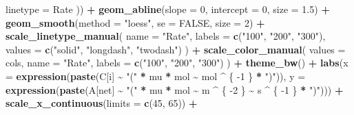 \documentclass[
]{krantz}
\makeatletter
\newenvironment{Shaded}{\begin{snugshade}}{\end{snugshade}}
\newcommand{\DataTypeTok}[1]{\textcolor[rgb]{0.13,0.29,0.53}{#1}}
\newcommand{\DecValTok}[1]{\textcolor[rgb]{0.00,0.00,0.81}{#1}}
\newcommand{\FloatTok}[1]{\textcolor[rgb]{0.00,0.00,0.81}{#1}}
\newcommand{\KeywordTok}[1]{\textcolor[rgb]{0.13,0.29,0.53}{\textbf{#1}}}
\newcommand{\NormalTok}[1]{#1}
\newcommand{\OperatorTok}[1]{\textcolor[rgb]{0.81,0.36,0.00}{\textbf{#1}}}
\newcommand{\OtherTok}[1]{\textcolor[rgb]{0.56,0.35,0.01}{#1}}
\newcommand{\StringTok}[1]{\textcolor[rgb]{0.31,0.60,0.02}{#1}}
\newenvironment{kframe}{%
\medskip{}
\setlength{\fboxsep}{.8em}
 \def\at@end@of@kframe{}%
 \ifinner\ifhmode%
  \def\at@end@of@kframe{\end{minipage}}%
  \begin{minipage}{\columnwidth}%
 \fi\fi%
 \def\FrameCommand##1{\hskip\@totalleftmargin \hskip-\fboxsep
 \colorbox{shadecolor}{##1}\hskip-\fboxsep
     \hskip-\linewidth \hskip-\@totalleftmargin \hskip\columnwidth}%
 \MakeFramed {\advance\hsize-\width
   \@totalleftmargin\z@ \linewidth\hsize
   \@setminipage}}%
 {\par\unskip\endMakeFramed%
 \at@end@of@kframe}
\renewenvironment{Shaded}{\begin{kframe}}{\end{kframe}}
\makeatother
\begin{document}
\begin{Shaded}
\begin{Highlighting}[]
    \DataTypeTok{linetype =}\NormalTok{ Rate}
\NormalTok{  )) }\OperatorTok{+}
\StringTok{  }\KeywordTok{geom\_abline}\NormalTok{(}\DataTypeTok{slope =} \DecValTok{0}\NormalTok{,}
              \DataTypeTok{intercept =} \DecValTok{0}\NormalTok{,}
              \DataTypeTok{size =} \FloatTok{1.5}\NormalTok{) }\OperatorTok{+}
\StringTok{  }\KeywordTok{geom\_smooth}\NormalTok{(}\DataTypeTok{method =} \StringTok{"loess"}\NormalTok{, }\DataTypeTok{se =} \OtherTok{FALSE}\NormalTok{, }\DataTypeTok{size =} \DecValTok{2}\NormalTok{) }\OperatorTok{+}
\StringTok{  }\KeywordTok{scale\_linetype\_manual}\NormalTok{(}
    \DataTypeTok{name =} \StringTok{"Rate"}\NormalTok{,}
    \DataTypeTok{labels =} \KeywordTok{c}\NormalTok{(}\StringTok{"100"}\NormalTok{, }\StringTok{"200"}\NormalTok{, }\StringTok{"300"}\NormalTok{),}
    \DataTypeTok{values =} \KeywordTok{c}\NormalTok{(}\StringTok{"solid"}\NormalTok{, }\StringTok{"longdash"}\NormalTok{, }\StringTok{"twodash"}\NormalTok{)}
\NormalTok{  ) }\OperatorTok{+}
\StringTok{  }\KeywordTok{scale\_color\_manual}\NormalTok{(}
    \DataTypeTok{values =}\NormalTok{ cols,}
    \DataTypeTok{name =} \StringTok{"Rate"}\NormalTok{,}
    \DataTypeTok{labels =} \KeywordTok{c}\NormalTok{(}\StringTok{"100"}\NormalTok{, }\StringTok{"200"}\NormalTok{, }\StringTok{"300"}\NormalTok{)}
\NormalTok{  ) }\OperatorTok{+}
\StringTok{  }\KeywordTok{theme\_bw}\NormalTok{() }\OperatorTok{+}
\StringTok{  }\KeywordTok{labs}\NormalTok{(}\DataTypeTok{x =} \KeywordTok{expression}\NormalTok{(}\KeywordTok{paste}\NormalTok{(C[i] }\OperatorTok{\textasciitilde{}}\StringTok{ "("} \OperatorTok{*}\StringTok{ }\NormalTok{mu }\OperatorTok{*}\StringTok{ }\NormalTok{mol }\OperatorTok{\textasciitilde{}}\StringTok{ }\NormalTok{mol }\OperatorTok{\^{}}\StringTok{ }\NormalTok{\{}
    \DecValTok{{-}1}
\NormalTok{  \} }\OperatorTok{*}\StringTok{ ")"}\NormalTok{)), }\DataTypeTok{y =} \KeywordTok{expression}\NormalTok{(}\KeywordTok{paste}\NormalTok{(A[net] }\OperatorTok{\textasciitilde{}}\StringTok{ "("} \OperatorTok{*}\StringTok{ }\NormalTok{mu }\OperatorTok{*}\StringTok{ }\NormalTok{mol }\OperatorTok{\textasciitilde{}}\StringTok{ }\NormalTok{m }\OperatorTok{\^{}}\StringTok{ }\NormalTok{\{}
    \DecValTok{{-}2}
\NormalTok{  \} }\OperatorTok{\textasciitilde{}}\StringTok{ }\NormalTok{s }\OperatorTok{\^{}}\StringTok{ }\NormalTok{\{}
    \DecValTok{{-}1}
\NormalTok{  \} }\OperatorTok{*}\StringTok{ ")"}\NormalTok{))) }\OperatorTok{+}
\StringTok{  }\KeywordTok{scale\_x\_continuous}\NormalTok{(}\DataTypeTok{limits =} \KeywordTok{c}\NormalTok{(}\DecValTok{45}\NormalTok{, }\DecValTok{65}\NormalTok{)) }\OperatorTok{+}

\end{Highlighting}
\end{Shaded}
\end{document}
